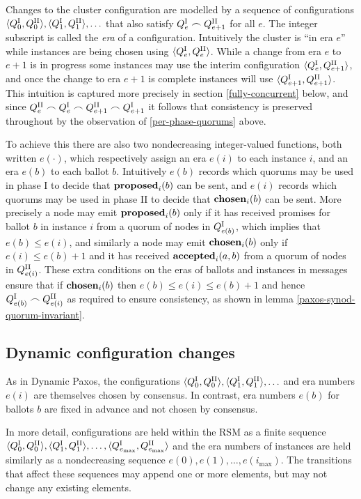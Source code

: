 \documentclass[journal]{IEEEtran}
\begin{document}
Changes to the cluster configuration are modelled by a sequence of
configurations $ \langle {Q}^\textrm{I}_{0}, {Q}^\textrm{II}_{0} \rangle, \langle {Q}^\textrm{I}_{1}, {Q}^\textrm{II}_{1}
\rangle, \ldots$ that also satisfy ${Q}^\textrm{I}_{e} \frown {Q}^\textrm{II}_{e+1}$ for all $e$.  The
integer subscript is called the \textit{era} of a configuration.  Intuitively
the cluster is ``in era $e$'' while instances are being chosen using $\langle
{Q}^\textrm{I}_{e}, {Q}^\textrm{II}_{e}\rangle$. While a change from era $e$ to $e+1$ is in progress
some instances may use the interim configuration $\langle {Q}^\textrm{I}_{e}, {Q}^\textrm{II}_{e+1}
\rangle$, and once the change to era $e+1$ is complete instances will use
$\langle {Q}^\textrm{I}_{e+1}, {Q}^\textrm{II}_{e+1} \rangle$. This intuition is captured more
precisely in section \ref{fully-concurrent} below, and since ${Q}^\textrm{II}_{e} \frown
{Q}^\textrm{I}_{e} \frown {Q}^\textrm{II}_{e+1} \frown {Q}^\textrm{I}_{e+1}$ it follows that consistency is
preserved throughout by the observation of \ref{per-phase-quorums} above.

To achieve this there are also two nondecreasing integer-valued functions, both
written $e(\cdot)$, which respectively assign an era $e(i)$ to each instance
$i$, and an era $e(b)$ to each ballot $b$. Intuitively $e(b)$ records which
quorums may be used in phase I to decide that $\mathbf{proposed}_{i}(b)$ can be sent, and
$e(i)$ records which quorums may be used in phase II to decide that
$\mathbf{chosen}_{i}(b)$ can be sent. More precisely a node may emit $\mathbf{proposed}_{i}(b)$ only
if it has received promises for ballot $b$ in instance $i$ from a quorum of
nodes in ${Q}^\textrm{I}_{e(b)}$, which implies that $e(b) \le e(i)$, and similarly a node
may emit $\mathbf{chosen}_{i}(b)$ only if ${e(i) \le e(b)+1}$ and it has received
$\mathbf{accepted}_{i}(a,b)$ from a quorum of nodes in ${Q}^\textrm{II}_{e(i)}$. These extra conditions
on the eras of ballots and instances in messages ensure that if $\mathbf{chosen}_{i}(b)$
then ${e(b) \le e(i) \le e(b)+1}$ and hence ${Q}^\textrm{I}_{e(b)} \frown {Q}^\textrm{II}_{e(i)}$ as
required to ensure consistency, as shown in lemma
\ref{paxos-synod-quorum-invariant}.

\subsection{Dynamic configuration changes}

As in Dynamic Paxos, the configurations $\langle {Q}^\textrm{I}_{0}, {Q}^\textrm{II}_{0} \rangle,
\langle {Q}^\textrm{I}_{1}, {Q}^\textrm{II}_{1} \rangle, \ldots$ and era numbers $e(i)$ are themselves
chosen by consensus. In contrast, era numbers $e(b)$ for ballots $b$ are fixed
in advance and not chosen by consensus.

In more detail, configurations are held within the RSM as a finite sequence
$\langle {Q}^\textrm{I}_{0}, {Q}^\textrm{II}_{0} \rangle, \langle {Q}^\textrm{I}_{1}, {Q}^\textrm{II}_{1} \rangle, \ldots,
\langle {Q}^\textrm{I}_{e_\mathrm{max}}, {Q}^\textrm{II}_{e_\mathrm{max}} \rangle$ and the era numbers
of instances are held similarly as a nondecreasing sequence $e(0), e(1),
\ldots, e(i_\mathrm{max})$.  The transitions that affect these sequences may
append one or more elements, but may not change any existing elements.
\end{document}
